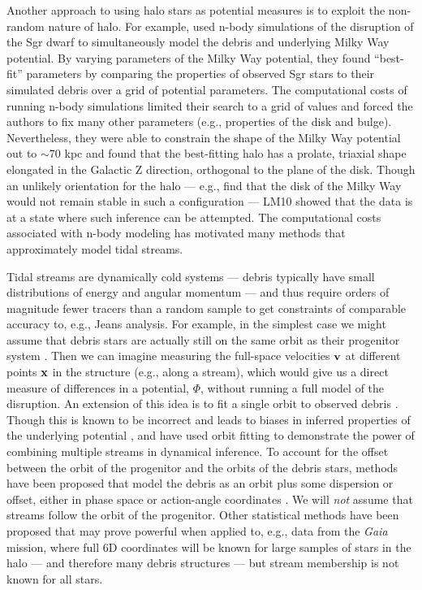 \documentclass[letterpaper,12pt,preprint]{aastex}
\newcommand{\project}[1]{\textsl{#1}}
\newcommand{\gaia}{\project{Gaia}}
\begin{document}
Another approach to using halo stars as potential measures is to exploit the non-random nature of halo. For example, \citet[][LM10]{law10} used n-body simulations of the disruption of the Sgr dwarf to simultaneously model the debris and underlying Milky Way potential. By varying parameters of the Milky Way potential, they found ``best-fit'' parameters by comparing the properties of observed Sgr stars to their simulated debris over a grid of potential parameters. The computational costs of running n-body simulations limited their search to a grid of values and forced the authors to fix many other parameters (e.g., properties of the disk and bulge). Nevertheless, they were able to constrain the shape of the Milky Way potential out to $\sim$70 kpc and found that the best-fitting halo has a prolate, triaxial shape elongated in the Galactic Z direction, orthogonal to the plane of the disk. Though an unlikely orientation for the halo --- e.g., \cite{debattista13} find that the disk of the Milky Way would not remain stable in such a configuration --- LM10 showed that the data is at a state where such inference can be attempted. The computational costs associated with n-body modeling has motivated many methods that approximately model tidal streams.

Tidal streams are dynamically cold systems --- debris typically have small distributions of energy and angular momentum --- and thus require orders of magnitude fewer tracers than a random sample to get constraints of comparable accuracy to, e.g., Jeans analysis. For example, in the simplest case we might assume that debris stars are actually still on the same orbit as their progenitor system \citep[a \emph{wrong} assumption, see e.g.,][]{eyre11}. Then we can imagine measuring the full-space velocities ${\bf v}$ at different points ${\bf x}$ in the structure (e.g., along a stream), which would give us a direct measure of differences in a potential, $\Phi$, without running a full model of the disruption. An extension of this idea is to fit a single orbit to observed debris \citep[e.g.,][]{koposov10, deg13}. Though this is known to be incorrect and leads to biases in inferred properties of the underlying potential \citep[e.g.,][]{eyre11, lux13, sanders13a}, \cite{deg14} and \cite{lux13} have used orbit fitting to demonstrate the power of combining multiple streams in dynamical inference. To account for the offset between the orbit of the progenitor and the orbits of the debris stars, methods have been proposed that model the debris as an orbit plus some dispersion or offset, either in phase space \citep[e.g.,][]{eyre09a, varghese11, kuepper12} or action-angle coordinates \citep{eyre11, sanders13b, bovy14, sanders14}. We will \emph{not} assume that streams follow the orbit of the progenitor. Other statistical methods have been proposed \citep[][]{penarrubia12, apw13, sanderson14} that may prove powerful when applied to, e.g., data from the \gaia\, mission, where full 6D coordinates will be known for large samples of stars in the halo --- and therefore many debris structures --- but stream membership is not known for all stars.
\end{document}
